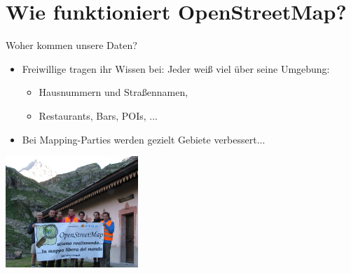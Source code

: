 \documentclass{beamer}
\begin{document}
\section{Wie funktioniert OpenStreetMap?}

\begin{frame}{Woher kommen unsere Daten?}

\begin{itemize}
  \item Freiwillige tragen ihr Wissen bei: Jeder weiß viel über seine Umgebung:
	\begin{itemize}
	  \item Hausnummern und Straßennamen,
	  \item Restaurants, Bars, POIs, ...
  \end{itemize}
  \item Bei Mapping-Parties werden gezielt Gebiete verbessert...
\end{itemize}

 \begin{center}
 \includegraphics[width=5cm]{alps_mp.jpg}
 \end{center}

\end{frame}

%
%
%
%
\end{document}
